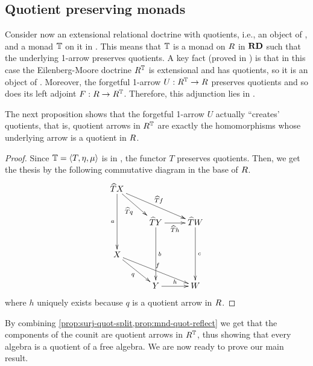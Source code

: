 \subsection{Quotient preserving monads}
\label{sect:quot-mnd}

Consider now an extensional relational doctrine with quotients, i.e., an object of \EQRDtn, and 
a  monad $\mathbb{T}$ on it in \EQRDtn. 
This means that $\mathbb{T}$ is a monad on $R$ in $\mathbf{RD}$ such that the underlying 1-arrow preserves quotients. 
% 
A key fact (proved in \cite{DagninoP25tac}) is that in this case the Eilenberg-Moore doctrine $R^{\mathbb{T}}$ is extensional and has quotients, so it is an object of \EQRDtn. 
Moreover, the forgetful 1-arrow ${U}:{R^{\mathbb{T}}}\rightarrow{R}$ preserves quotients and so does its left adjoint ${F}:{R}\rightarrow{R^{\mathbb{T}}}$. 
Therefore, this adjunction  lies in \EQRDtn. 

The next proposition shows that the forgetful 1-arrow $U$ actually  ``creates' quotients, that is, 
quotient arrows in $R^{\mathbb{T}}$ are exactly the homomorphisms  whose underlying arrow is a quotient in $R$. 

\begin{proof}
Since $\mathbb{T} = {\langle T,\eta,\mu \rangle }$ is in \EQRDtn, the functor $T$ preserves quotients. 
Then, we get the thesis by the following commutative diagram in the base of $R$. 
\[\xymatrix{
  \fn{T}X 
  \ar[rrd]^-{\fn{T}f} 
  \ar[rd]_-{\fn{T}q}
  \ar[dd]_-{a} 
\\ 
& \fn{T}Y 
  \ar[r]_-{\fn{T}h}
  \ar[dd]^-{b} 
& \fn{T}W 
  \ar[dd]^-{c} 
\\
  X 
  \ar[rrd]^-{f} 
  \ar[rd]_-{q}
\\
& Y 
  \ar[r]^-{h} 
& W 
}\]
where $h$ uniquely exists because $q$ is a quotient arrow in $R$. 
\end{proof}

By combining 
\cref{prop:surj-quot-split,prop:mnd-quot-reflect} we get that the components of the counit  are quotient arrows in $R^{\mathbb{T}}$, thus showing that every algebra is a quotient of a free algebra. 
We are now ready to prove  our main result. 

